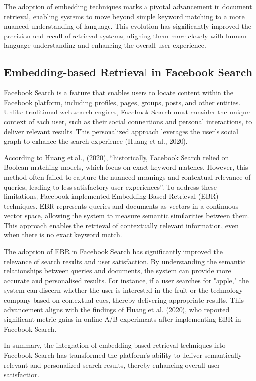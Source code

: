 The adoption of embedding techniques marks a pivotal advancement in document retrieval, enabling systems to move beyond simple keyword matching to a more nuanced understanding of language. This evolution has significantly improved the precision and recall of retrieval systems, aligning them more closely with human language understanding and enhancing the overall user experience.

\subsection{Embedding-based Retrieval in Facebook Search}

Facebook Search is a feature that enables users to locate content within the Facebook platform, including profiles, pages, groups, posts, and other entities. Unlike traditional web search engines, Facebook Search must consider the unique context of each user, such as their social connections and personal interactions, to deliver relevant results. This personalized approach leverages the user's social graph to enhance the search experience (Huang et al., 2020).

According to Huang et al., (2020), “historically, Facebook Search relied on Boolean matching models, which focus on exact keyword matches. However, this method often failed to capture the nuanced meanings and contextual relevance of queries, leading to less satisfactory user experiences”. To address these limitations, Facebook implemented Embedding-Based Retrieval (EBR) techniques. EBR represents queries and documents as vectors in a continuous vector space, allowing the system to measure semantic similarities between them. This approach enables the retrieval of contextually relevant information, even when there is no exact keyword match.

The adoption of EBR in Facebook Search has significantly improved the relevance of search results and user satisfaction. By understanding the semantic relationships between queries and documents, the system can provide more accurate and personalized results. For instance, if a user searches for "apple," the system can discern whether the user is interested in the fruit or the technology company based on contextual cues, thereby delivering appropriate results. This advancement aligns with the findings of Huang et al. (2020), who reported significant metric gains in online A/B experiments after implementing EBR in Facebook Search.

In summary, the integration of embedding-based retrieval techniques into Facebook Search has transformed the platform's ability to deliver semantically relevant and personalized search results, thereby enhancing overall user satisfaction.

